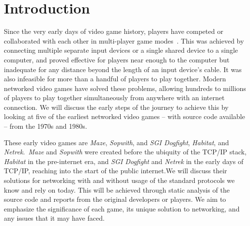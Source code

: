 \section{Introduction}\label{sec:intro}


Since the very early days of video game history, players have competed or collaborated with each other in multi-player game modes~\cite{bnlfirst}. This was achieved by connecting multiple separate input devices or a single shared device to a single computer, and proved effective for players near enough to the computer but inadequate for any distance beyond the length of an input device's cable. It was also infeasible for more than a handful of players to play together. Modern networked video games have solved these problems, allowing hundreds to millions of players to play together simultaneously from anywhere with an internet connection. We will discuss the early steps of the journey to achieve this by looking at five of the earliest networked video games -- with source code available -- from the 1970s and 1980s.

These early video games are \textit{Maze}, \textit{Sopwith}, and \textit{SGI Dogfight}, \textit{Habitat}, and \textit{Netrek}.\ \textit{Maze} and \textit{Sopwith} were created before the ubiquity of the TCP/IP stack, \textit{Habitat} in the pre-internet era, and \textit{SGI Dogfight} and \textit{Netrek} in the early days of TCP/IP, reaching into the start of the public internet.\@ We will discuss their solutions for networking with and without usage of the standard protocols we know and rely on today. This will be achieved through static analysis of the source code and reports from the original developers or players. We aim to emphasize the significance of each game, its unique solution to networking, and any issues that it may have faced.
